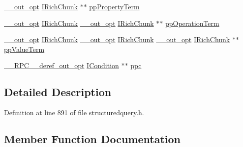 \begin{DoxyCompactItemize}
\item 
\hyperlink{sal_8h_a1ab4597e9d0c9bcc3f676c58b25019fe}{\+\_\+\+\_\+out\+\_\+opt} \hyperlink{structuredquery_8h_a155fe105ebaf3c6b04f856696b0e2596}{I\+Rich\+Chunk} $\ast$$\ast$ \hyperlink{struct_i_condition_vtbl_a0d7afaf8cfddd2000809db1df71d4578}{pp\+Property\+Term}
\item 
\hyperlink{sal_8h_a1ab4597e9d0c9bcc3f676c58b25019fe}{\+\_\+\+\_\+out\+\_\+opt} \hyperlink{structuredquery_8h_a155fe105ebaf3c6b04f856696b0e2596}{I\+Rich\+Chunk} \hyperlink{sal_8h_a1ab4597e9d0c9bcc3f676c58b25019fe}{\+\_\+\+\_\+out\+\_\+opt} \hyperlink{structuredquery_8h_a155fe105ebaf3c6b04f856696b0e2596}{I\+Rich\+Chunk} $\ast$$\ast$ \hyperlink{struct_i_condition_vtbl_addbc6663fb5ea0323df2d8a4eb46dc8a}{pp\+Operation\+Term}
\item 
\hyperlink{sal_8h_a1ab4597e9d0c9bcc3f676c58b25019fe}{\+\_\+\+\_\+out\+\_\+opt} \hyperlink{structuredquery_8h_a155fe105ebaf3c6b04f856696b0e2596}{I\+Rich\+Chunk} \hyperlink{sal_8h_a1ab4597e9d0c9bcc3f676c58b25019fe}{\+\_\+\+\_\+out\+\_\+opt} \hyperlink{structuredquery_8h_a155fe105ebaf3c6b04f856696b0e2596}{I\+Rich\+Chunk} \hyperlink{sal_8h_a1ab4597e9d0c9bcc3f676c58b25019fe}{\+\_\+\+\_\+out\+\_\+opt} \hyperlink{structuredquery_8h_a155fe105ebaf3c6b04f856696b0e2596}{I\+Rich\+Chunk} $\ast$$\ast$ \hyperlink{struct_i_condition_vtbl_a8b40b0610565df491a6da53aac2c93c7}{pp\+Value\+Term}
\item 
\hyperlink{rpcsal_8h_ab29e89ceb0eb0b075c6f6299b0de6a21}{\+\_\+\+\_\+\+R\+P\+C\+\_\+\+\_\+deref\+\_\+out\+\_\+opt} \hyperlink{structuredquery_8h_a44e1be344248ef67d647837c4aae42fa}{I\+Condition} $\ast$$\ast$ \hyperlink{struct_i_condition_vtbl_a4a9023600efc19652dca5a17076b24a1}{ppc}
\end{DoxyCompactItemize}


\subsection{Detailed Description}


Definition at line 891 of file structuredquery.\+h.



\subsection{Member Function Documentation}
